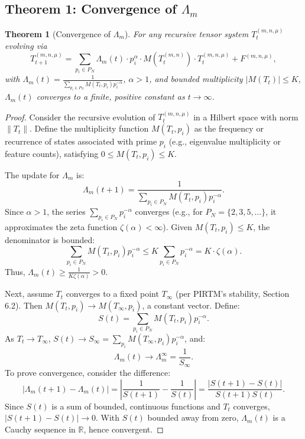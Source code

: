 \documentclass{article}
\theoremstyle{plain}
\newtheorem{theorem}{Theorem}
\begin{document}
\subsection{Theorem 1: Convergence of \(\Lambda_m\)}
\begin{theorem}[Convergence of \(\Lambda_m\)]
For any recursive tensor system \( T_t^{(m, n, \mu)} \) evolving via
\[
T_{t+1}^{(m, n, \mu)} = \sum_{p_i \in P_N} \Lambda_m(t) \cdot p_i^\alpha \cdot M(T_t^{(m, n)}) \cdot T_t^{(m, n, \mu)} + F^{(m, n, \mu)},
\]
with \(\Lambda_m(t) = \frac{1}{\sum_{p_i \in P_N} M(T_t, p_i) p_i^{-\alpha}}\), \(\alpha > 1\), and bounded multiplicity \( |M(T_t)| \leq K \), \(\Lambda_m(t)\) converges to a finite, positive constant as \( t \to \infty \).
\end{theorem}

\begin{proof}
Consider the recursive evolution of \( T_t^{(m, n, \mu)} \) in a Hilbert space with norm \( \| T_t \| \). Define the multiplicity function \( M(T_t, p_i) \) as the frequency or recurrence of states associated with prime \( p_i \) (e.g., eigenvalue multiplicity or feature counts), satisfying \( 0 \leq M(T_t, p_i) \leq K \).

The update for \(\Lambda_m\) is:
\[
\Lambda_m(t+1) = \frac{1}{\sum_{p_i \in P_N} M(T_t, p_i) p_i^{-\alpha}}.
\]
Since \(\alpha > 1\), the series \(\sum_{p_i \in P_N} p_i^{-\alpha}\) converges (e.g., for \( P_N = \{2, 3, 5, \ldots\} \), it approximates the zeta function \(\zeta(\alpha) < \infty\)). Given \( M(T_t, p_i) \leq K \), the denominator is bounded:
\[
\sum_{p_i \in P_N} M(T_t, p_i) p_i^{-\alpha} \leq K \sum_{p_i \in P_N} p_i^{-\alpha} = K \cdot \zeta(\alpha).
\]
Thus, \(\Lambda_m(t) \geq \frac{1}{K \zeta(\alpha)} > 0\).

Next, assume \( T_t \) converges to a fixed point \( T_\infty \) (per PIRTM’s stability, Section 6.2). Then \( M(T_t, p_i) \to M(T_\infty, p_i) \), a constant vector. Define:
\[
S(t) = \sum_{p_i \in P_N} M(T_t, p_i) p_i^{-\alpha}.
\]
As \( T_t \to T_\infty \), \( S(t) \to S_\infty = \sum_{p_i} M(T_\infty, p_i) p_i^{-\alpha} \), and:
\[
\Lambda_m(t) \to \Lambda_m^\infty = \frac{1}{S_\infty}.
\]
To prove convergence, consider the difference:
\[
|\Lambda_m(t+1) - \Lambda_m(t)| = \left| \frac{1}{S(t+1)} - \frac{1}{S(t)} \right| = \frac{|S(t+1) - S(t)|}{S(t+1) S(t)}.
\]
Since \( S(t) \) is a sum of bounded, continuous functions and \( T_t \) converges, \( |S(t+1) - S(t)| \to 0 \). With \( S(t) \) bounded away from zero, \(\Lambda_m(t)\) is a Cauchy sequence in \(\mathbb{R}\), hence convergent.
\end{proof}
\end{document}
